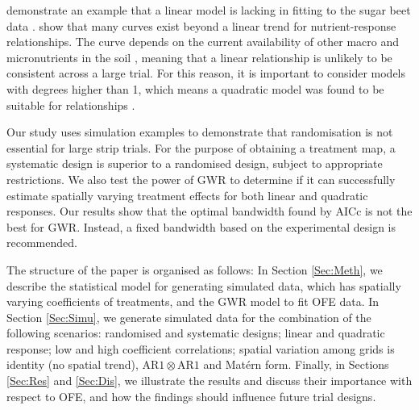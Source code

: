 \documentclass[a4paper]{article} 	%
\newcommand{\Matern}{Mat\'ern }
\newcommand{\AR}{\mathrm{AR1}}
\begin{document}

\textcite{Piepho2018Tutorial} demonstrate an example that a linear model is lacking in fitting to the sugar beet data \parencite{Petersen1994Agricultural}. \textcite{Glynn2007} show that many curves exist beyond a linear trend for nutrient-response relationships. The curve depends on the current availability of other macro and micronutrients in the soil \parencite{Marschner2011}, meaning that a linear relationship is unlikely to be consistent across a large trial. For this reason, it is important to consider models with degrees higher than 1, which means a quadratic model was found to be suitable for relationships \parencite{Piepho2018Tutorial, Liben2019}. 



% 

Our study uses simulation examples to demonstrate that randomisation is not essential for large strip trials. For the purpose of obtaining a treatment map, a systematic design is superior to a randomised design, subject to appropriate restrictions. We also test the power of GWR to determine if it can successfully estimate spatially varying treatment effects for both linear and quadratic responses. Our results show that the optimal bandwidth found by AICc is not the best for GWR. Instead, a fixed bandwidth based on the experimental design is recommended.


The structure of the paper is organised as follows: In Section \ref{Sec:Meth}, we describe the statistical model for generating simulated data, which has spatially varying coefficients of treatments, and the GWR model to fit OFE data. In Section \ref{Sec:Simu}, we generate simulated data for the combination of the following scenarios: randomised and systematic designs; linear and quadratic response; low and high coefficient correlations; spatial variation among grids is identity (no spatial trend), $\AR\otimes\AR$ and \Matern form. Finally, in Sections \ref{Sec:Res} and \ref{Sec:Dis}, we illustrate the results and discuss their importance with respect to OFE, and how the findings should influence future trial designs. 
\end{document}
